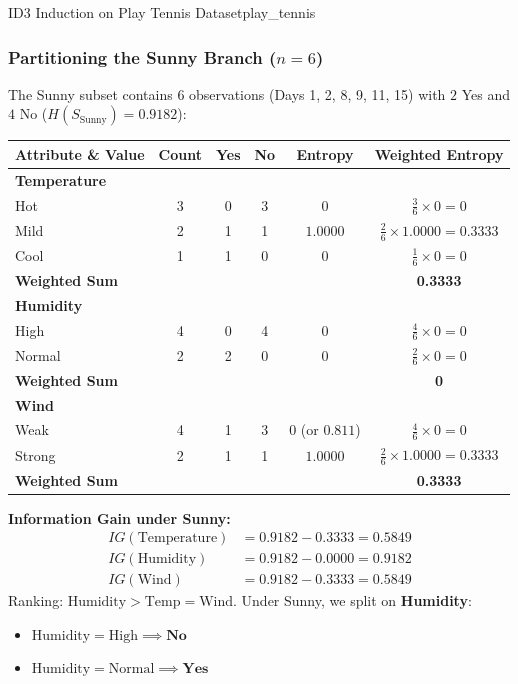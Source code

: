 \begin{example}{ID3 Induction on Play Tennis Dataset}{play_tennis}
\subsubsection{Partitioning the Sunny Branch (\texorpdfstring{$n = 6$}{n = 6})}
The Sunny subset contains 6 observations (Days 1, 2, 8, 9, 11, 15) with $2$ Yes and $4$ No ($H(S_{\text{Sunny}}) = 0.9182$):
\begin{center}\renewcommand{\arraystretch}{1.35}
\begin{tabular}{lccccc}
\toprule
\textbf{Attribute \& Value} & \textbf{Count} & \textbf{Yes} & \textbf{No} & \textbf{Entropy} & \textbf{Weighted Entropy} \\
\midrule
\textbf{Temperature} & & & & & \\
Hot & 3 & 0 & 3 & $0$ & $\frac{3}{6} \times 0 = 0$ \\
Mild & 2 & 1 & 1 & $1.0000$ & $\frac{2}{6} \times 1.0000 = 0.3333$ \\
Cool & 1 & 1 & 0 & $0$ & $\frac{1}{6} \times 0 = 0$ \\
\textbf{Weighted Sum} & & & & & \textbf{0.3333} \\
\midrule
\textbf{Humidity} & & & & & \\
High & 4 & 0 & 4 & $0$ & $\frac{4}{6} \times 0 = 0$ \\
Normal & 2 & 2 & 0 & $0$ & $\frac{2}{6} \times 0 = 0$ \\
\textbf{Weighted Sum} & & & & & \textbf{0} \\
\midrule
\textbf{Wind} & & & & & \\
Weak & 4 & 1 & 3 & $0$ (or $0.811$) & $\frac{4}{6} \times 0 = 0$ \\
Strong & 2 & 1 & 1 & $1.0000$ & $\frac{2}{6} \times 1.0000 = 0.3333$ \\
\textbf{Weighted Sum} & & & & & \textbf{0.3333} \\
\bottomrule
\end{tabular}
\end{center}

\textbf{Information Gain under Sunny:}
\begin{align*}
    IG(\text{Temperature}) &= 0.9182 - 0.3333 = 0.5849 \\[4pt]
    IG(\text{Humidity}) &= 0.9182 - 0.0000 = \mathbf{0.9182} \\[4pt]
    IG(\text{Wind}) &= 0.9182 - 0.3333 = 0.5849
\end{align*}
Ranking: $\text{Humidity} > \text{Temp} = \text{Wind}$.
Under Sunny, we split on \textbf{Humidity}:
\begin{itemize}
    \item $\text{Humidity} = \text{High} \implies \mathbf{No}$
    \item $\text{Humidity} = \text{Normal} \implies \mathbf{Yes}$
\end{itemize}


\end{example}
